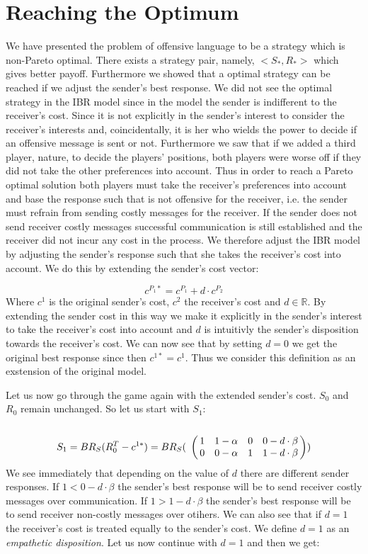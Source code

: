 \documentclass[10pt]{article}
\begin{document}
\section{Reaching the Optimum}
We have presented the problem of offensive language to be a strategy which is non-Pareto optimal. There exists a strategy pair, namely, $<S_*,R_*>$ which gives better payoff. Furthermore we showed that a optimal strategy can be reached if we adjust the sender's best response. We did not see the optimal strategy in the IBR model since in the model the sender is indifferent to the receiver's cost. Since it is not explicitly in the sender's interest to consider the receiver's interests and, coincidentally, it is her who wields the power to decide if an offensive message is sent or not. Furthermore we saw that if we added a third player, nature, to decide the players' positions, both players were worse off if they did not take the other preferences into account. Thus in order to reach a Pareto optimal solution both players must take the receiver's preferences into account and base the response such that is not offensive for the receiver, i.e. the sender must refrain from sending costly messages for the receiver. If the sender does not send receiver costly messages successful communication is still established and the receiver did not incur any cost in the process. We therefore adjust the IBR model by adjusting the sender's response such that she takes the receiver's cost into account. We do this by extending the sender's cost vector:

$$c^{P_1*}=c^{P_1} + d \cdot c^{P_2}$$
Where $c^{1}$ is the original sender's cost, $c^{2}$ the receiver's cost and $d \in \mathbb{R}$. By extending the sender cost in this way we make it explicitly in the sender's interest to take the receiver's cost into account and $d$ is intuitivly the sender's disposition towards the receiver's cost. We can now see that by setting $d=0$ we get the original best response since then $c^{1*}=c^{1}$. Thus we consider this definition as an exstension of the original model.

Let us now go through the game again with the extended sender's cost. $S_0$ and $R_0$ remain unchanged. So let us start with $S_1$:
\begin{equation*}
S_1= BR_S(R_0^T-c^{1*})=BR_S(
\bordermatrix{
                & & & &    \cr
     &       1 &         1-\alpha & 0       & 0-d\cdot \beta \cr
     &       0 &         0-\alpha & 1      & 1-d\cdot \beta
 }
)
\end{equation*}
We see immediately that depending on the value of $d$ there are different sender responses. If $1<0-d\cdot \beta$ the sender's best response will be to send receiver costly messages over communication.  If $1>1-d\cdot \beta$ the sender's best response will be to send receiver non-costly messages over otihers. We can also see that if $d=1$ the receiver's cost is treated equally to the sender's cost. We define $d=1$ as an \textit{empathetic disposition}. Let us now continue with $d=1$ and then we get:
\end{document}
